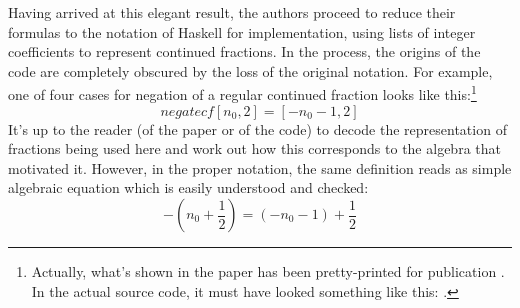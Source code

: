 Having arrived at this elegant result, the authors proceed to reduce their formulas to the notation of Haskell for implementation, using lists of integer coefficients to represent continued fractions. In the process, the origins of the code are completely obscured by the loss of the original notation. For example, one of four cases for negation of a regular continued fraction looks like this:\footnote{Actually, what's shown in the paper has been pretty-printed for publication \cite{lhs2tex}. In the actual source code, it must have looked something like this: .}
$$\mathit{negatecf} [n_0, 2] = [-n_0-1, 2]$$
It's up to the reader (of the paper or of the code) to decode the representation of fractions being used here and work out how this corresponds to the algebra that motivated it. However, in the proper notation, the same definition reads as simple algebraic equation which is easily understood and checked:
$$-\left(n_0 + \frac{1}{2}\right) = (-n_0 - 1) + \frac{1}{2}$$

\vspace{12pt}

